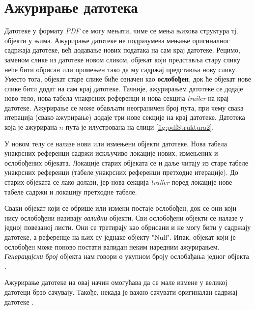 \documentclass[12pt,oneside]{memoir}
\begin{document}
\section{Ажурирање датотека}
\label{sec:azuriranje}

Датотеке у формату \textit{PDF} се могу мењати, чиме се мења њихова структура тј. објекти у њима. Ажурирање датотеке не подразумева мењање оригиналног садржаја датотеке, већ додавање нових података на сам крај датотеке. Рецимо, заменом слике из датотеке новом сликом, објекат који представља стару слику неће бити обрисан или промењен тако да му садржај представља нову слику. Уместо тога, објекат старе слике биће означен као \textbf{ослобођен}, док ће објекат нове слике бити додат на сам крај датотеке. Тачније, ажурирањем датотеке се додаје ново тело, нова табела унакрсних референци и нова секција \textit{trailer} на крај датотеке. Ажурирање се може обављати неограничен број пута, при чему свака итерација (свако ажурирање) додаје три нове секције на крај датотеке. Датотека која је ажурирана $n$ пута је илустрована на слици \ref{fig:pdfStruktura2}. 

У новом телу се налазе нови или измењени објекти датотеке. Нова табела унакрсних референци садржи искључиво локације нових, измењених и ослобођених објеката. Локације старих објеката се и даље читају из старе табеле унакрсних референци (табеле унакрсних референци претходне итерације). До старих објеката се лако долази, јер нова секција \textit{trailer} поред локације нове табеле садржи и локацију претходне табеле. 

Сваки објекат који се обрише или измени постаје ослобођен, док се они који нису ослобођени називају \textit{валидни} објекти. Сви ослобођени објекти се налазе у једној повезаној листи. Они се третирају као обрисани и не могу бити у садржају датотеке, а референце на њих су једнаке објекту "Null". Ипак, објекат који је ослобођен може поново постати валидан неким наредним ажурирањем. \textit{Генерацијски број} објекта нам говори о укупном броју ослобађања једног објекта \cite{PDFDoc, introToPdf, basicStrPdf}.

Ажурирање датотеке на овај начин омогућава да се мале измене у великој датотеци брзо сачувају. Такође, некада је важно сачувати оригиналан садржај датотеке \cite{PDFDoc}.
\end{document}
